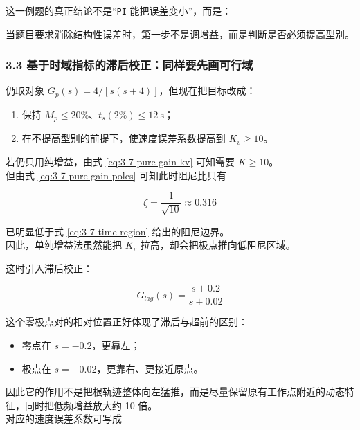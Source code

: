 \documentclass[
  11pt]{article}
\providecommand{\tightlist}{%
  \setlength{\itemsep}{0pt}\setlength{\parskip}{0pt}}
\renewenvironment{quote}
  {\begin{HandoutQuoteBox}\small\color{TitleBlue}\noindent\ignorespaces}
  {\end{HandoutQuoteBox}}
\begin{document}
这一例题的真正结论不是``\texttt{PI} 能把误差变小''，而是：

\begin{quote}
当题目要求消除结构性误差时，第一步不是调增益，而是判断是否必须提高型别。
\end{quote}

\subsubsection{3.3
基于时域指标的滞后校正：同样要先画可行域}\label{ux57faux4e8eux65f6ux57dfux6307ux6807ux7684ux6edeux540eux6821ux6b63ux540cux6837ux8981ux5148ux753bux53efux884cux57df}

仍取对象 \(G_p(s)=4/[s(s+4)]\)，但现在把目标改成：

\begin{enumerate}
\def\labelenumi{\arabic{enumi}.}
\tightlist
\item
  保持 \(M_p \le 20\%\)、\(t_s(2\%) \le 12\ \mathrm{s}\)；
\item
  在不提高型别的前提下，使速度误差系数提高到 \(K_v \ge 10\)。
\end{enumerate}

若仍只用纯增益，由式 \ref{eq:3-7-pure-gain-kv} 可知需要 \(K \ge 10\)。\\
但由式 \ref{eq:3-7-pure-gain-poles} 可知此时阻尼比只有

\begin{equation}
\zeta=\frac{1}{\sqrt{10}}\approx 0.316
\tag{3-7-37}\label{eq:3-7-pure-gain-zeta10}
\end{equation}

已明显低于式 \ref{eq:3-7-time-region} 给出的阻尼边界。\\
因此，单纯增益法虽然能把 \(K_v\) 拉高，却会把极点推向低阻尼区域。

这时引入滞后校正：

\begin{equation}
G_{lag}(s)=\frac{s+0.2}{s+0.02}
\tag{3-7-38}\label{eq:3-7-time-lag-controller}
\end{equation}

这个零极点对的相对位置正好体现了滞后与超前的区别：

\begin{itemize}
\tightlist
\item
  零点在 \(s=-0.2\)，更靠左；
\item
  极点在 \(s=-0.02\)，更靠右、更接近原点。
\end{itemize}

因此它的作用不是把根轨迹整体向左猛推，而是尽量保留原有工作点附近的动态特征，同时把低频增益放大约
10 倍。\\
对应的速度误差系数可写成
\end{document}
